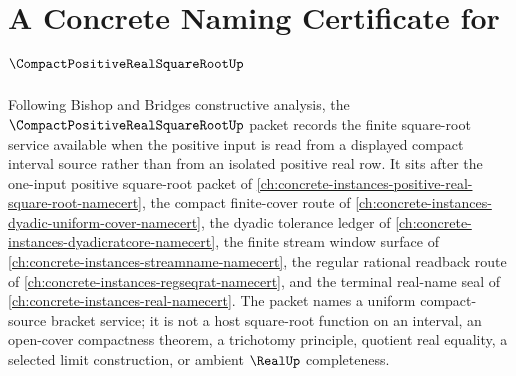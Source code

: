 \chapter{A Concrete Naming Certificate for $\CompactPositiveRealSquareRootUp$}
\label{ch:concrete-instances-compact-positive-real-square-root-namecert}

Following Bishop and Bridges constructive analysis, the $\CompactPositiveRealSquareRootUp$ packet records the finite square-root service available when the positive input is read from a displayed compact interval source rather than from an isolated positive real row. It sits after the one-input positive square-root packet of \autoref{ch:concrete-instances-positive-real-square-root-namecert}, the compact finite-cover route of \autoref{ch:concrete-instances-dyadic-uniform-cover-namecert}, the dyadic tolerance ledger of \autoref{ch:concrete-instances-dyadicratcore-namecert}, the finite stream window surface of \autoref{ch:concrete-instances-streamname-namecert}, the regular rational readback route of \autoref{ch:concrete-instances-regseqrat-namecert}, and the terminal real-name seal of \autoref{ch:concrete-instances-real-namecert}. The packet names a uniform compact-source bracket service; it is not a host square-root function on an interval, an open-cover compactness theorem, a trichotomy principle, quotient real equality, a selected limit construction, or ambient $\RealUp$ completeness.

